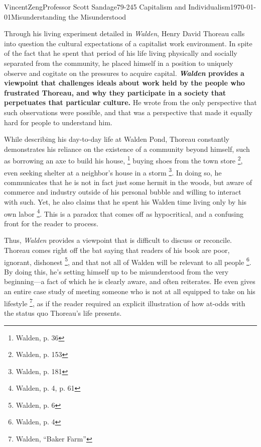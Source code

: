 \documentclass[12pt]{article}
\begin{document}
\begin{mla}{Vincent}{Zeng}{Professor Scott Sandage}{79-245 Capitalism and Individualism}{\today}{Misunderstanding the Misunderstood}

Through his living experiment detailed in \textit{Walden}, Henry David
Thoreau calls into question the cultural expectations of a capitalist work
environment. In spite of the fact that he spent that period of his life living
physically and socially separated from the community, he placed himself in a
position to uniquely observe and cogitate on the pressures to acquire capital.
\textbf{\textit{Walden} provides a viewpoint that challenges ideals about work held by
the people who frustrated Thoreau, and why they participate in a society that
perpetuates that particular culture.} He wrote from the only perspective that
such observations were possible, and that was a perspective that made it
equally hard for people to understand him.

While describing his day-to-day life at Walden Pond, Thoreau constantly
demonstrates his reliance on the existence of a community beyond himself, such
as borrowing an axe to build his house,
\footnote{Walden, p. 36} buying shoes from the town store \footnote{Walden, p.
153}, even seeking shelter at a neighbor's house in a storm \footnote{Walden,
p. 181}. In doing so, he communicates that he is not in fact just some hermit
in the woods, but aware of commerce and industry outside of his personal
bubble and willing to interact with such. Yet, he also claims that he
spent his Walden time living only by his own labor \footnote{Walden, p. 4, p.
61}. This is a paradox that comes off as hypocritical, and a confusing front
for the reader to process.

Thus, \textit{Walden} provides a viewpoint that is difficult to discuss
or reconcile. Thoreau comes right off the bat saying that readers of his
book are poor, ignorant, dishonest \footnote{Walden, p. 6}, and that not all of Walden will be
relevant to all people \footnote{Walden, p. 4}. By doing this, he's setting himself up to be
misunderstood from the very beginning---a fact of which he is clearly aware,
and often reiterates.  He even gives an entire case study of meeting someone
who is not at all equipped to take on his lifestyle \footnote{Walden, ``Baker
Farm''}, as if the reader required an explicit illustration of how at-odds
with the status quo Thoreau's life presents. 


\end{mla}
\end{document}
